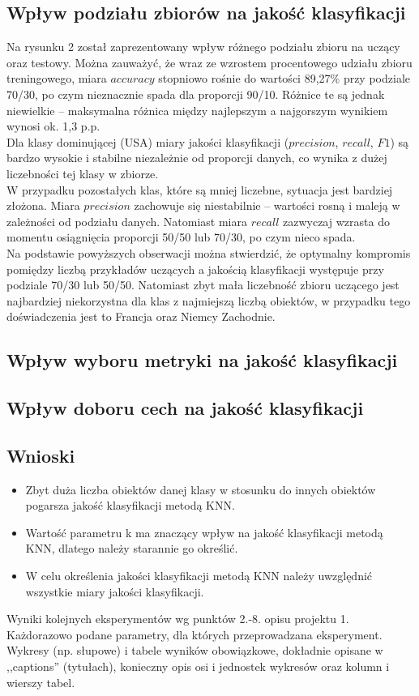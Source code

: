 \documentclass{article}
\begin{document}
\subsection{Wpływ podziału zbiorów na jakość klasyfikacji}
Na rysunku 2 został zaprezentowany wpływ różnego podziału zbioru na uczący oraz testowy. Można zauważyć, że wraz ze wzrostem procentowego udziału zbioru treningowego, miara \(accuracy\) stopniowo rośnie do wartości 89{,}27\% przy podziale 70/30, po czym nieznacznie spada dla proporcji 90/10. Różnice te są jednak niewielkie – maksymalna różnica między najlepszym a najgorszym wynikiem wynosi ok. 1,3 p.p. \\
Dla klasy dominującej (USA) miary jakości klasyfikacji (\(precision\), \(recall\), \(F1\)) są bardzo wysokie i stabilne niezależnie od proporcji danych, co wynika z dużej liczebności tej klasy w zbiorze. \\
W przypadku pozostałych klas, które są mniej liczebne, sytuacja jest bardziej złożona. Miara \(precision\) zachowuje się niestabilnie – wartości rosną i maleją w zależności od podziału danych. Natomiast miara \(recall\) zazwyczaj wzrasta do momentu osiągnięcia proporcji 50/50 lub 70/30, po czym nieco spada. \\
Na podstawie powyższych obserwacji można stwierdzić, że optymalny kompromis pomiędzy liczbą przykładów uczących a jakością klasyfikacji występuje przy podziale 70/30 lub 50/50. Natomiast zbyt mała liczebność zbioru uczącego jest najbardziej niekorzystna dla klas z najmiejszą liczbą obiektów, w przypadku tego doświadczenia jest to Francja oraz Niemcy Zachodnie.
\subsection{Wpływ wyboru metryki na jakość klasyfikacji}

\subsection{Wpływ doboru cech na jakość klasyfikacji}

\subsection{Wnioski}
\begin{itemize}
    \item Zbyt duża liczba obiektów danej klasy w stosunku do innych obiektów pogarsza jakość klasyfikacji metodą KNN.
    \item Wartość parametru k ma znaczący wpływ na jakość klasyfikacji metodą KNN, dlatego należy starannie go określić.
    \item W celu określenia jakości klasyfikacji metodą KNN należy uwzględnić wszystkie miary jakości klasyfikacji.
\end{itemize}
Wyniki kolejnych eksperymentów wg punktów 2.-8. opisu projektu 1.  Każdorazowo
podane parametry, dla których przeprowadzana eksperyment. 
Wykresy (np. słupowe) i tabele wyników
obowiązkowe, dokładnie opisane w ,,captions'' (tytułach), konieczny opis osi i
jednostek wykresów oraz kolumn i wierszy tabel.\\ 
\end{document}
